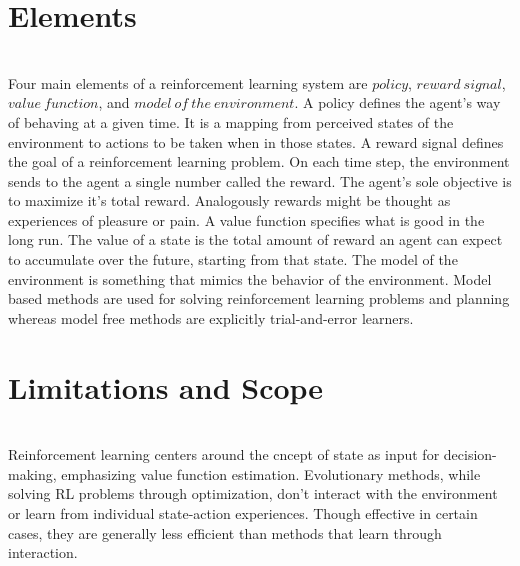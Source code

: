 \documentclass{article}
\begin{document}
\section{Elements}
\begin{paragraph}
\\
Four main elements of a reinforcement learning system are $policy$, $reward\ signal$, $value\ function$, and $model\ of\ the\ environment$. A policy defines the agent’s way of behaving at a given time. It is a mapping from perceived states of the environment to actions to be taken when in those states. A reward signal defines the goal of a reinforcement learning problem. On each time step, the environment sends to the agent a single number called the reward. The agent’s sole objective is to maximize it's total reward. Analogously rewards might be thought as experiences of pleasure or pain. A value function specifies what is good in the long run. The value of a state is the total amount of reward an agent can expect to accumulate over the future, starting from that state. The model of the environment is something that mimics the behavior of the environment. Model based methods are used for solving reinforcement learning problems and planning whereas model free methods are explicitly trial-and-error learners.
\end{paragraph}
\section{Limitations and Scope}
\begin{paragraph}
\\
Reinforcement learning centers around the cncept of state as input for decision-making, emphasizing value function estimation. Evolutionary methods, while solving RL problems through optimization, don't interact with the environment or learn from individual state-action experiences. Though effective in certain cases, they are generally less efficient than methods that learn through interaction. 
\end{paragraph}
\end{document}
